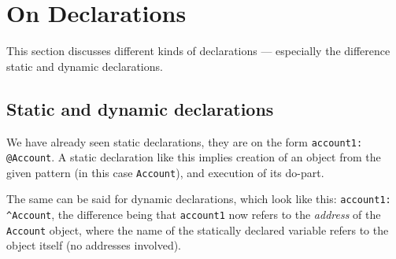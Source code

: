 \section{On Declarations}

This section discusses different kinds of declarations --- especially
the difference static and dynamic declarations.

\subsection*{Static and dynamic declarations}

We have already seen static declarations, they are on the form
\verb|account1: @Account|. A static declaration like this implies
creation of an object from the given pattern (in this case
\texttt{Account}), and execution of its do-part.

The same can be said for dynamic declarations, which look like this:
\verb|account1: ^Account|, the difference being that \texttt{account1}
now refers to the \emph{address} of the \texttt{Account} object, where
the name of the statically declared variable refers to the object
itself (no addresses involved).